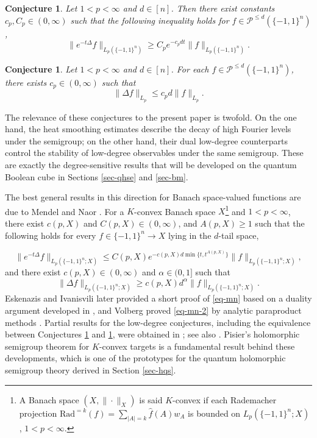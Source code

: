 \documentclass{amsbook}
\newtheorem{conjecture}[theorem]{Conjecture}
\theoremstyle{definition}
\theoremstyle{remark}
\numberwithin{section}{chapter}
\numberwithin{equation}{chapter}
\newcommand{\1}{\mathbf{1}}
\begin{document}
\begin{conjecture}\label{conj-2}
Let $1<p<\infty$ and $d\in [n]$. Then there exist constants $c_p,C_p \in (0,\infty)$ such that the following inequality holds for $f\in \mathcal{P}^{\leq d}(\{-1,1\}^n)$,
\begin{equation}\label{con-3}
\|e^{-t\Delta} f\|_{L_p(\{-1,1\}^n)} \geq  C_p e^{-c_pdt} \|f\|_{L_p(\{-1,1\}^n)}.
\end{equation}
\end{conjecture}
\begin{conjecture}\label{conj-2-2}
Let $1<p<\infty$ and $d\in [n]$. For each $f\in \mathcal{P}^{\leq d}(\{-1,1\}^n)$, there exists $c_p\in  (0,\infty)$ such that 
\begin{equation}\label{con-4}
\|\Delta f\|_{L_p} \leq c_p d\|f\|_{L_p}.
\end{equation}
\end{conjecture}

The relevance of these conjectures to the present paper is twofold.  On the one hand, the heat smoothing estimates describe the decay of high Fourier levels under the semigroup; on the other hand, their dual low-degree counterparts control the stability of low-degree observables under the same semigroup.  These are exactly the degree-sensitive results that will be developed on the quantum Boolean cube in Sections \ref{sec-qhse} and \ref{sec-bm}.

The best general results in this direction for Banach space-valued functions are due to Mendel and Naor \cite{MN2014}. For a $K$-convex Banach space $X$\footnote{A Banach space $(X,\|\cdot\|_X)$ is said $K$-convex if each Rademacher projection $\mathrm{Rad}^{=k}(f)=\sum_{|A|=k}\widehat{f}(A)w_{A}$ is bounded on $L_p(\{-1,1\}^n; X)$, $1<p<\infty$.} and $1<p<\infty$, there exist $c(p,X)$ and $C(p,X)\in (0,\infty)$, and $A(p,X)\geq 1$ such that the following holds for every $f\in \{-1,1\}^{n}\to X$ lying in the $d$-tail space,

\begin{equation}\label{eq-mn}
\|e^{-t\Delta} f\|_{L_p(\{-1,1\}^{n}; X)} \le C(p,X) e^{-c(p,X)d\min\{t,t^{A(p,X)}\}} \|f\|_{L_p(\{-1,1\}^n;X)},
\end{equation}
and there exist $c(p,X) \in (0,\infty)$ and $\alpha\in (0,1]$ such that
\begin{equation}\label{eq-mn-2}
\|\Delta f\|_{L_p(\{-1,1\}^n;X)}\geq c(p,X) d^{\alpha} \|f\|_{L_p(\{-1,1\}^n;X)}. 
\end{equation}
Eskenazis and Ivanisvili later provided a short proof of \eqref{eq-mn} based on a duality argument developed in \cite{EI2020}, and Volberg proved \eqref{eq-mn-2} by analytic paraproduct methods \cite{Vo2024}.  Partial results for the low-degree conjectures, including the equivalence between Conjectures \ref{conj-2} and \ref{conj-2-2}, were obtained in \cite{DDFKOSW2025}; see also \cite{FHKL2016,EI2020,Vo2024}.  Pisier's holomorphic semigroup theorem for $K$-convex targets \cite{Pi1982} is a fundamental result behind these developments, which is one of the prototypes for the quantum holomorphic semigroup theory derived in Section \ref{sec-hqs}.
\end{document}

